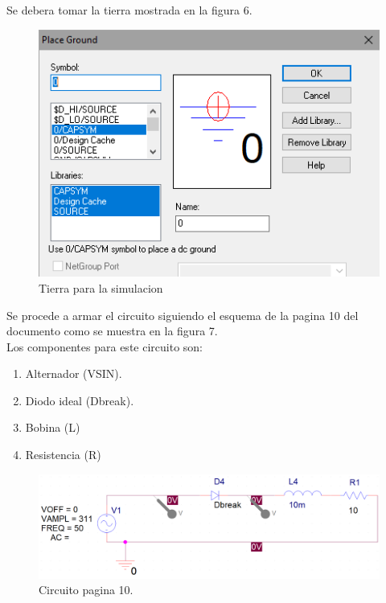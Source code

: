 ﻿\documentclass[letterpaper]{article}
\begin{document}
\begin{large}
\begin{enumerate}
\begin{figure}[htbp]
            \end{figure}
        \end{enumerate}
        Se debera tomar la tierra mostrada en la figura 6.\newpage
        \begin{figure}[htbp]
            \centering
            \includegraphics[scale=0.5]{gnd.png}
            \caption{Tierra para la simulacion}
            \label{fig:GNDsim}
        \end{figure}
        Se procede a armar el circuito siguiendo el esquema de la pagina 10 del documento como se muestra en la figura 7.\\ Los componentes para este circuito son:\\
        \begin{enumerate}
            \item Alternador (VSIN).
            \item Diodo ideal (Dbreak).
            \item Bobina (L)
            \item Resistencia (R)
        \end{enumerate}
        \begin{figure}[htbp]
        \centering
        \includegraphics[scale=0.4]{cir1.png}
        \caption{Circuito pagina 10.}
        \end{figure}

\end{large}
\end{document}
